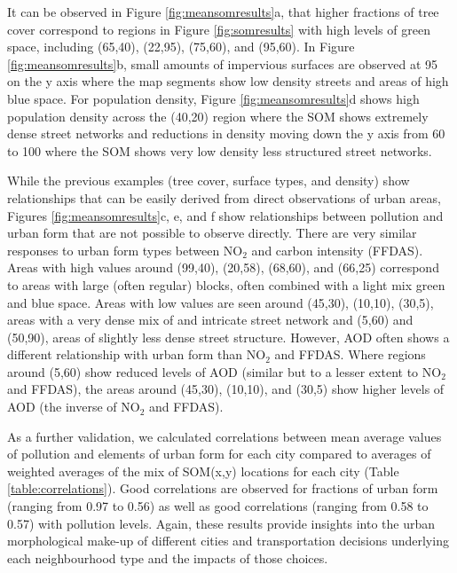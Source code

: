 It can be observed in Figure \ref{fig:meansomresults}a, that higher fractions of tree cover correspond to regions in Figure \ref{fig:somresults} with high levels of green space, including (65,40), (22,95), (75,60), and (95,60). In Figure \ref{fig:meansomresults}b, small amounts of impervious surfaces are observed at 95 on the y axis where the map segments show low density streets and areas of high blue space. For population density, Figure \ref{fig:meansomresults}d shows high population density across the (40,20) region where the SOM shows extremely dense street networks and reductions in density moving down the y axis from 60 to 100 where the SOM shows very low density less structured street networks.

While the previous examples (tree cover, surface types, and density) show relationships that can be easily derived from direct observations of urban areas, Figures \ref{fig:meansomresults}c, e, and f show relationships between pollution and urban form that are not possible to observe directly. There are very similar responses to urban form types between NO$_{2}$ and carbon intensity (FFDAS). Areas with high values around (99,40), (20,58), (68,60), and (66,25) correspond to areas with large (often regular) blocks, often combined with a light mix green and blue space. Areas with low values are seen around (45,30), (10,10), (30,5), areas with a very dense mix of and intricate street network and (5,60) and (50,90), areas of slightly less dense street structure. However, AOD often shows a different relationship with urban form than NO$_{2}$ and FFDAS. Where regions around (5,60) show reduced levels of AOD (similar but to a lesser extent to NO$_{2}$ and FFDAS), the areas around (45,30), (10,10), and (30,5) show higher levels of AOD (the inverse of NO$_{2}$ and FFDAS). 

As a further validation, we calculated correlations between mean average values of pollution and elements of urban form for each city compared to averages of weighted averages of the mix of SOM(x,y) locations for each city (Table \ref{table:correlations}). Good correlations are observed for fractions of urban form (ranging from 0.97 to 0.56) as well as good correlations (ranging from 0.58 to 0.57) with pollution levels. Again, these results provide insights into the urban morphological make-up of different cities and transportation decisions underlying each neighbourhood type and the impacts of those choices.

